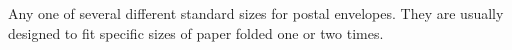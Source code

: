 Any one of several different standard sizes for postal envelopes. They are
usually designed to fit specific sizes of paper folded one or two times.